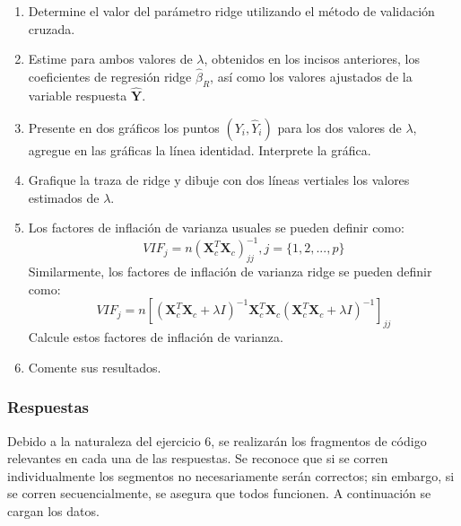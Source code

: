 \documentclass[11pt]{article}
\providecommand{\tightlist}{%
      \setlength{\itemsep}{0pt}\setlength{\parskip}{0pt}}
\begin{document}
\begin{enumerate}
\def\labelenumi{\arabic{enumi}.}
\setcounter{enumi}{1}
\tightlist
\item
  Determine el valor del parámetro ridge utilizando el método de
  validación cruzada.
\item
  Estime para ambos valores de \(\lambda\), obtenidos en los incisos
  anteriores, los coeficientes de regresión ridge \(\hat{\beta}_R\), así
  como los valores ajustados de la variable respuesta
  \(\hat{\mathbf{Y}}\).
\item
  Presente en dos gráficos los puntos \((Y_i,\hat{Y}_i)\) para los dos
  valores de \(\lambda\), agregue en las gráficas la línea identidad.
  Interprete la gráfica.
\item
  Grafique la traza de ridge y dibuje con dos líneas vertiales los
  valores estimados de \(\lambda\).
\item
  Los factores de inflación de varianza usuales se pueden definir como:
  \[VIF_j=n(\mathbf{X}_c^T\mathbf{X}_c)^{-1}_{jj},j=\{1,2,...,p\}\]
  Similarmente, los factores de inflación de varianza ridge se pueden
  definir como:
  \[VIF_j=n\left[(\mathbf{X}_c^T\mathbf{X}_c+\lambda I)^{-1}\mathbf{X}_c^T\mathbf{X}_c(\mathbf{X}_c^T\mathbf{X}_c+\lambda I)^{-1}\right]_{jj}\]
  Calcule estos factores de inflación de varianza.
\item
  Comente sus resultados.
\end{enumerate}

    \hypertarget{respuestas}{%
\subsubsection{Respuestas}\label{respuestas}}

Debido a la naturaleza del ejercicio 6, se realizarán los fragmentos de
código relevantes en cada una de las respuestas. Se reconoce que si se
corren individualmente los segmentos no necesariamente serán correctos;
sin embargo, si se corren secuencialmente, se asegura que todos
funcionen. A continuación se cargan los datos.
\end{document}
